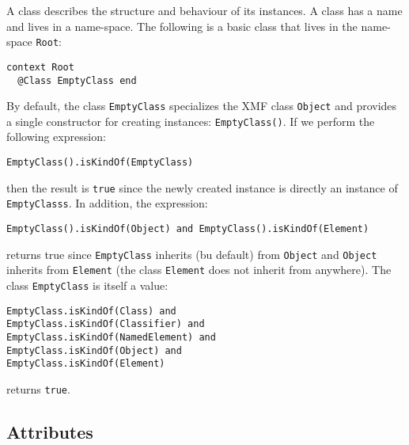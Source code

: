\documentclass{article}
\begin{document}
A class describes the structure and behaviour of its instances. A class has a name and lives in a name-space.
The following is a basic class that lives in the name-space {\tt Root}:
\begin{verbatim}
context Root
  @Class EmptyClass end
\end{verbatim}
By default, the class {\tt EmptyClass} specializes the XMF class {\tt Object} and provides a single
constructor for creating instances: {\tt EmptyClass()}. If we perform the following expression:
\begin{verbatim}
EmptyClass().isKindOf(EmptyClass)
\end{verbatim}
then the result is {\tt true} since the newly created instance is directly an instance of {\tt EmptyClasss}.
In addition, the expression:
\begin{verbatim}
EmptyClass().isKindOf(Object) and EmptyClass().isKindOf(Element)
\end{verbatim}
returns true since {\tt EmptyClass} inherits (bu default) from {\tt Object} and {\tt Object} inherits
from {\tt Element} (the class {\tt Element} does not inherit from anywhere). The class {\tt EmptyClass}
is itself a value:
\begin{verbatim}
EmptyClass.isKindOf(Class) and 
EmptyClass.isKindOf(Classifier) and 
EmptyClass.isKindOf(NamedElement) and
EmptyClass.isKindOf(Object) and 
EmptyClass.isKindOf(Element)
\end{verbatim}
returns {\tt true}.

\subsection{Attributes}
\end{document}

